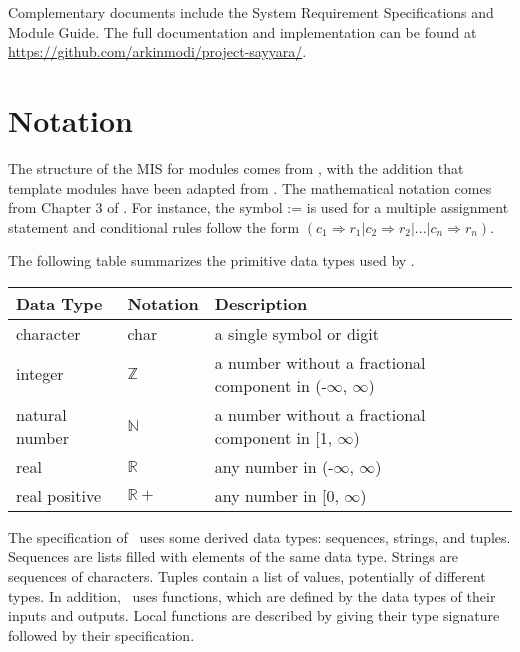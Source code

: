 \documentclass[12pt, titlepage]{article}
\begin{document}
Complementary documents include the System Requirement Specifications and Module Guide. The full
documentation and implementation can be found at
\url{https://github.com/arkinmodi/project-sayyara/}.

\section{Notation}


The structure of the MIS for modules comes from \citet{HoffmanAndStrooper1995}, with the addition
that template modules have been adapted from \cite{GhezziEtAl2003}. The mathematical notation comes
from Chapter 3 of \citet{HoffmanAndStrooper1995}. For instance, the symbol := is used for a
multiple assignment statement and conditional rules follow the form $(c_1 \Rightarrow r_1 | c_2
	\Rightarrow r_2 | ... | c_n \Rightarrow r_n )$.

The following table summarizes the primitive data types used by \progname.

\begin{center}
	\renewcommand{\arraystretch}{1.2}
	\noindent
	\begin{tabular}{l l p{7.5cm}}
		\toprule
		\textbf{Data Type} & \textbf{Notation} & \textbf{Description}                                             \\
		\midrule
		character          & char              & a single symbol or digit                                         \\
		integer            & $\mathbb{Z}$      & a number without a fractional component in (-$\infty$, $\infty$) \\
		natural number     & $\mathbb{N}$      & a number without a fractional component in [1, $\infty$)         \\
		real               & $\mathbb{R}$      & any number in (-$\infty$, $\infty$)                              \\
		real positive      & $\mathbb{R}+$     & any number in [0, $\infty$)                                      \\
		\bottomrule
	\end{tabular}
\end{center}

\noindent
The specification of \progname \ uses some derived data types: sequences, strings, and
tuples. Sequences are lists filled with elements of the same data type. Strings
are sequences of characters. Tuples contain a list of values, potentially of
different types. In addition, \progname \ uses functions, which
are defined by the data types of their inputs and outputs. Local functions are
described by giving their type signature followed by their specification.
\end{document}
